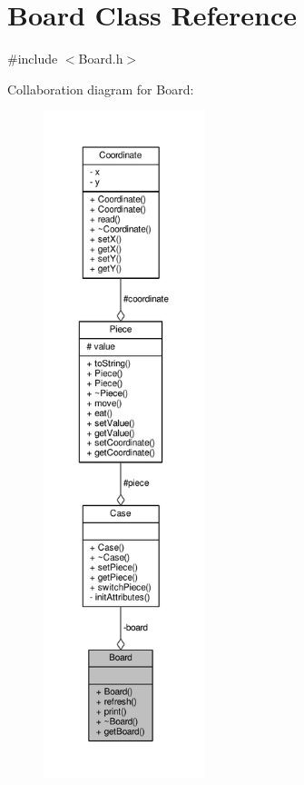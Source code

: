 \hypertarget{class_board}{}\section{Board Class Reference}
\label{class_board}


{\ttfamily \#include $<$Board.\+h$>$}



Collaboration diagram for Board\+:\nopagebreak
\begin{figure}[H]
\begin{center}
\leavevmode
\includegraphics[height=550pt]{class_board__coll__graph}
\end{center}
\end{figure}
